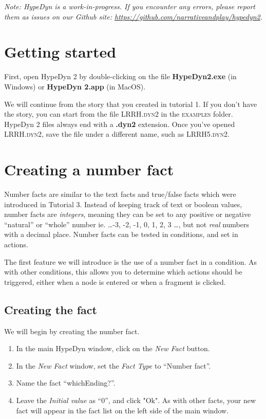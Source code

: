 \documentclass{article}
\begin{document}
\textit{Note:  HypeDyn is a work-in-progress. If you encounter any errors, please report them as issues on our Github site: \url{https://github.com/narrativeandplay/hypedyn2}.}

\section{Getting started}

First, open HypeDyn 2 by double-clicking on the file \textbf{HypeDyn2.exe} (in Windows) or \textbf{HypeDyn 2.app} (in MacOS).

We will continue from the story that you created in tutorial 1. If you don't have the story, you can start from the file \textsc{LRRH.dyn2} in the \textsc{examples} folder. HypeDyn 2 files always end with a \textbf{.dyn2} extension. Once you've opened \textsc{LRRH.dyn2}, save the file under a different name, such as \textsc{LRRH5.dyn2}.

\section{Creating a number fact}

Number facts are similar to the text facts and true/false facts which 
were introduced in Tutorial 3. Instead of keeping track of text or 
boolean values, number facts are \textit{integers}, meaning they can be set  to any positive or negative ``natural'' or ``whole'' number ie. \dots -3, -2, -1, 0, 1, 2, 3 \dots, but not \textit{real} numbers with a 
decimal place. Number facts can be tested in conditions, and set in 
actions.

The first feature we will introduce is the use of a number fact in a condition. As with other conditions, this allows you to determine which actions should be triggered, either when a node is entered or when a fragment is clicked.

\subsection{Creating the fact}

We will begin by creating the number fact.

\begin{enumerate}
  \item In the main HypeDyn window, click on the \textit{New Fact} button.
  \item In the \textit{New Fact} window, set the \textit{Fact Type} to ``Number fact''.
  \item Name the fact ``whichEnding?''.
  \item Leave the \textit{Initial value} as ``0'', and click "Ok". As with other  facts, your new fact will appear in the fact list on the  left side of the main window.  
\end{enumerate}
\end{document}
